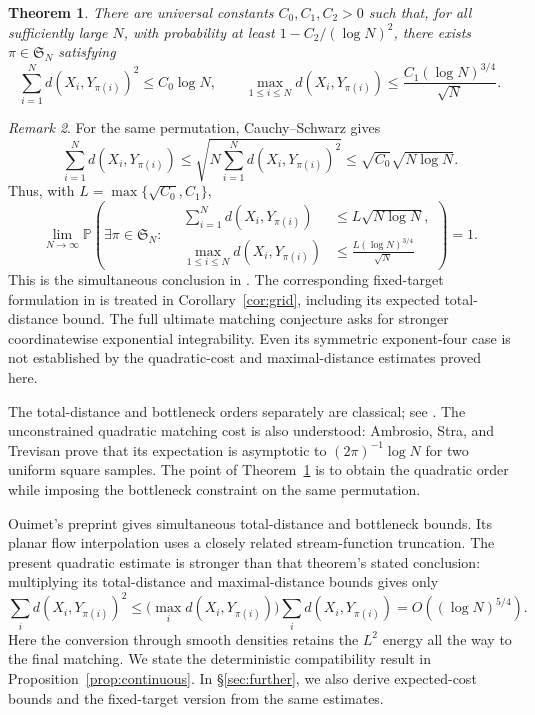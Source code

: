 \documentclass[11pt]{article}
\newcommand{\Pbb}{\mathbb P}
\newtheorem{theorem}{Theorem}[section]
\theoremstyle{remark}
\newtheorem{remark}[theorem]{Remark}
\numberwithin{equation}{section}
\begin{document}
\begin{theorem}\label{thm:main}
    There are universal constants \(C_0,C_1,C_2>0\) such that, for all sufficiently large \(N\), with probability at least \(1-C_2/(\log N)^2\), there exists \(\pi\in\mathfrak S_N\) satisfying
    \[
        \sum_{i=1}^N d(X_i,Y_{\pi(i)})^2\le C_0\log N, \qquad \max_{1\le i\le N}d(X_i,Y_{\pi(i)}) \le \frac{C_1(\log N)^{3/4}}{\sqrt N}.
    \]
\end{theorem}
\begin{remark}
For the same permutation, Cauchy--Schwarz gives
\[
 \sum_{i=1}^N d(X_i,Y_{\pi(i)})
 \le \sqrt{N\sum_{i=1}^N d(X_i,Y_{\pi(i)})^2}
 \le \sqrt{C_0}\sqrt{N\log N}.
\]
Thus, with \(L=\max\{\sqrt{C_0},C_1\}\),
\[
 \lim_{N\to\infty}\Pbb\left(
 \exists\pi\in\mathfrak S_N:\quad
 \begin{aligned}
  \sum_{i=1}^N d(X_i,Y_{\pi(i)})
     &\le L\sqrt{N\log N},\\
  \max_{1\le i\le N}d(X_i,Y_{\pi(i)})
     &\le \frac{L(\log N)^{3/4}}{\sqrt N}
 \end{aligned}
 \right)=1.
\]
This is the simultaneous conclusion in \cite[Problem~5.3]{Tal26}.
The corresponding fixed-target formulation in
\cite[Question~4.9.1]{Tal21} is treated in
Corollary~\ref{cor:grid}, including its expected total-distance bound.
The full ultimate matching conjecture
\cite[Research Problem~17.1.2]{Tal21} asks for stronger coordinatewise
exponential integrability. Even its symmetric exponent-four case is
not established by the quadratic-cost and maximal-distance estimates
proved here.
\end{remark}

The total-distance and bottleneck orders separately are classical;
see \cite[Theorems~4.5.1 and~4.7.1]{Tal21}. The unconstrained
quadratic matching cost is also understood: Ambrosio, Stra, and
Trevisan \cite[Theorem~1.1]{AST19} prove that its expectation is
asymptotic to \((2\pi)^{-1}\log N\) for two uniform square samples.
The point of Theorem~\ref{thm:main} is to obtain the quadratic order
while imposing the bottleneck constraint on the same permutation.

Ouimet's preprint \cite[Theorem~2.1]{Oui26} gives simultaneous
total-distance and bottleneck bounds. Its planar flow interpolation
\cite[Lemmas~2.9--2.10]{Oui26} uses a closely related stream-function
truncation. The present quadratic estimate is stronger than that
theorem's stated conclusion: multiplying its total-distance and
maximal-distance bounds gives only
\[
 \sum_i d(X_i,Y_{\pi(i)})^2
 \le \bigl(\max_i d(X_i,Y_{\pi(i)})\bigr)
          \sum_i d(X_i,Y_{\pi(i)})
 =O((\log N)^{5/4}).
\]
Here the conversion through smooth densities retains the
\(L^2\) energy all the way to the final matching.
We state the deterministic compatibility result in
Proposition~\ref{prop:continuous}.
In \S\ref{sec:further}, we also derive expected-cost bounds and the
fixed-target version from the same estimates.
\end{document}
